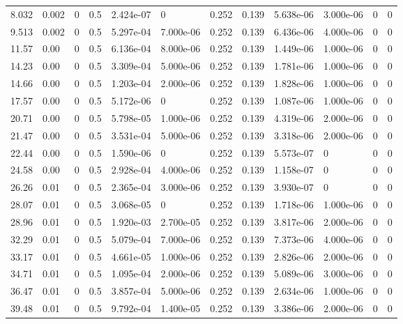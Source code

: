 \documentclass[preview]{standalone}
\begin{document}
{{\begin{tabular}{L{1.2cm}C{1.2cm} C{0.3cm}C{0.5cm} C{1.4cm}C{1.4cm} C{1.4cm}C{1.4cm} C{1.6cm}C{1.6cm} C{1.6cm}C{1.6cm}}
  8.032  &  0.002  & 0     & 0.5 &  2.424e-07  & 0  &  0.252&   0.139& 5.638e-06 & 3.000e-06   &  0 & 0  \\ 
  9.513  &  0.002  & 0     & 0.5 &  5.297e-04  & 7.000e-06  &  0.252&   0.139& 6.436e-06 & 4.000e-06   &  0 & 0  \\ 
  11.57  &  0.00  & 0     & 0.5 &  6.136e-04  & 8.000e-06  &  0.252&   0.139& 1.449e-06 & 1.000e-06   &  0 & 0  \\ 
  14.23  &  0.00  & 0     & 0.5 &  3.309e-04  & 5.000e-06  &  0.252&   0.139& 1.781e-06 & 1.000e-06   &  0 & 0  \\ 
  14.66  &  0.00  & 0     & 0.5 &  1.203e-04  & 2.000e-06  &  0.252&   0.139& 1.828e-06 & 1.000e-06   &  0 & 0  \\ 
  17.57  &  0.00  & 0     & 0.5 &  5.172e-06  & 0  &  0.252&   0.139& 1.087e-06 & 1.000e-06   &  0 & 0  \\ 
  20.71  &  0.00  & 0     & 0.5 &  5.798e-05  & 1.000e-06  &  0.252&   0.139& 4.319e-06 & 2.000e-06   &  0 & 0  \\ 
  21.47  &  0.00  & 0     & 0.5 &  3.531e-04  & 5.000e-06  &  0.252&   0.139& 3.318e-06 & 2.000e-06   &  0 & 0  \\ 
  22.44  &  0.00  & 0     & 0.5 &  1.590e-06  & 0  &  0.252&   0.139& 5.573e-07 & 0   &  0 & 0  \\ 
  24.58  &  0.00  & 0     & 0.5 &  2.928e-04  & 4.000e-06  &  0.252&   0.139& 1.158e-07 & 0   &  0 & 0  \\ 
  26.26  &  0.01  & 0     & 0.5 &  2.365e-04  & 3.000e-06  &  0.252&   0.139& 3.930e-07 & 0   &  0 & 0  \\ 
  28.07  &  0.01  & 0     & 0.5 &  3.068e-05  & 0  &  0.252&   0.139& 1.718e-06 & 1.000e-06   &  0 & 0  \\ 
  28.96  &  0.01  & 0     & 0.5 &  1.920e-03  & 2.700e-05  &  0.252&   0.139& 3.817e-06 & 2.000e-06   &  0 & 0  \\ 
  32.29  &  0.01  & 0     & 0.5 &  5.079e-04  & 7.000e-06  &  0.252&   0.139& 7.373e-06 & 4.000e-06   &  0 & 0  \\ 
  33.17  &  0.01  & 0     & 0.5 &  4.661e-05  & 1.000e-06  &  0.252&   0.139& 2.826e-06 & 2.000e-06   &  0 & 0  \\ 
  34.71  &  0.01  & 0     & 0.5 &  1.095e-04  & 2.000e-06  &  0.252&   0.139& 5.089e-06 & 3.000e-06   &  0 & 0  \\ 
  36.47  &  0.01  & 0     & 0.5 &  3.857e-04  & 5.000e-06  &  0.252&   0.139& 2.634e-06 & 1.000e-06   &  0 & 0  \\ 
  39.48  &  0.01  & 0     & 0.5 &  9.792e-04  & 1.400e-05  &  0.252&   0.139& 3.386e-06 & 2.000e-06   &  0 & 0  \\ 

\end{tabular}}}
\end{document}
